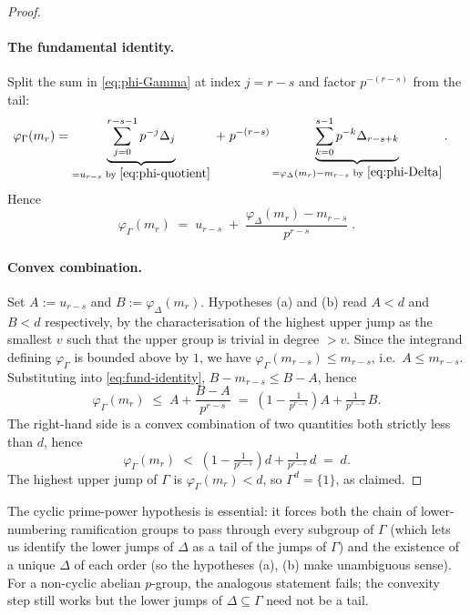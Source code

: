 \documentclass[11pt]{article}
\begin{document}
\begin{proof}
\paragraph{The fundamental identity.}
Split the sum in \eqref{eq:phi-Gamma} at index $j = r-s$ and factor
$p^{-(r-s)}$ from the tail:
\begin{align*}
\varphi_\Gamma(m_r)
 &= \underbrace{\sum_{j=0}^{r-s-1} p^{-j}\Delta_j}_{= u_{r-s}\text{ by }\eqref{eq:phi-quotient}}
   \;+\; p^{-(r-s)}\underbrace{\sum_{k=0}^{s-1} p^{-k}\Delta_{r-s+k}}_{= \varphi_\Delta(m_r) - m_{r-s}\text{ by }\eqref{eq:phi-Delta}}.
\end{align*}
Hence
\begin{equation}\label{eq:fund-identity}
\boxed{\;\varphi_\Gamma(m_r) \;=\; u_{r-s} \;+\; \frac{\varphi_\Delta(m_r) - m_{r-s}}{p^{r-s}}\;.\;}
\end{equation}

\paragraph{Convex combination.}
Set $A := u_{r-s}$ and $B := \varphi_\Delta(m_r)$. Hypotheses (a) and (b) read
$A < d$ and $B < d$ respectively, by the characterisation of the highest upper
jump as the smallest $v$ such that the upper group is trivial in degree $> v$.
Since the integrand defining $\varphi_\Gamma$ is bounded above by $1$, we have
$\varphi_\Gamma(m_{r-s}) \leq m_{r-s}$, i.e.\ $A \leq m_{r-s}$. Substituting
into \eqref{eq:fund-identity}, $B - m_{r-s} \leq B - A$, hence
\[
\varphi_\Gamma(m_r) \;\leq\; A + \frac{B - A}{p^{r-s}}
                    \;=\; \left(1 - \tfrac{1}{p^{r-s}}\right) A
                          + \tfrac{1}{p^{r-s}}\, B.
\]
The right-hand side is a convex combination of two quantities both strictly
less than $d$, hence
\[
\varphi_\Gamma(m_r) \;<\; \left(1 - \tfrac{1}{p^{r-s}}\right) d
                          + \tfrac{1}{p^{r-s}}\, d \;=\; d.
\]
The highest upper jump of $\Gamma$ is $\varphi_\Gamma(m_r) < d$, so
$\Gamma^d = \{1\}$, as claimed.
\end{proof}

\begin{remark}
The cyclic prime-power hypothesis is essential: it forces both the chain of
lower-numbering ramification groups to pass through every subgroup of $\Gamma$
(which lets us identify the lower jumps of $\Delta$ as a tail of the jumps of
$\Gamma$) and the existence of a unique $\Delta$ of each order (so the
hypotheses (a), (b) make unambiguous sense). For a non-cyclic abelian
$p$-group, the analogous statement fails; the convexity step still works but
the lower jumps of $\Delta \subseteq \Gamma$ need not be a tail.
\end{remark}
\end{document}
